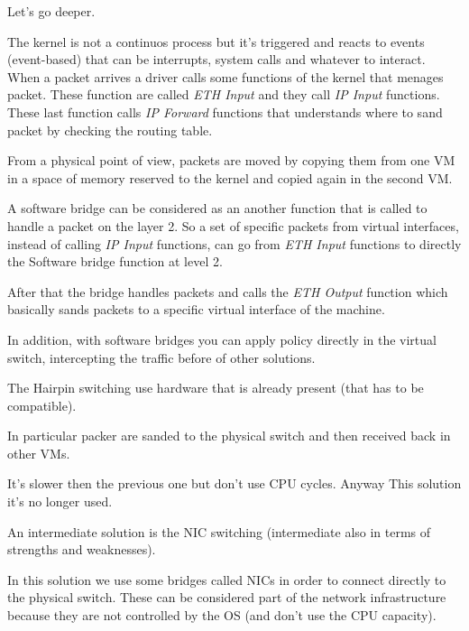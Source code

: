             Let's go deeper.
            
            The kernel is not a continuos process but it's triggered and reacts to events (event-based) that can be interrupts, system calls and whatever to interact.
            When a packet arrives a driver calls some functions of the kernel that menages packet. These function are called \textit{ETH Input} and they call \textit{IP Input} functions. These last function calls \textit{IP Forward} functions that understands where to sand packet by checking the routing table. 
            
            From a physical point of view, packets are moved by copying them from one VM in a space of memory reserved to the kernel and copied again in the second VM.
            
            A software bridge can be considered as an another function that is called to handle a packet on the layer 2. So a set of specific packets from virtual interfaces, instead of calling \textit{IP Input} functions, can go from \textit{ETH Input} functions to directly the Software bridge function at level 2.
            
            After that the bridge handles packets and calls the \textit{ETH Output} function which basically sands packets to a specific virtual interface of the machine.
            
            In addition, with software bridges you can apply policy directly in the virtual switch, intercepting the traffic before of other solutions.
            
            
            The Hairpin switching use hardware that is already present (that has to be compatible).
    
            In particular packer are sanded to the physical switch and then received back in other VMs.
            
            It's slower then the previous one but don't use CPU cycles. Anyway This solution it's no longer used.
            

            An intermediate solution is the NIC switching (intermediate also in terms of strengths and weaknesses). 
            
            In this solution we use some bridges called NICs in order to connect directly to the physical switch. These can be considered part of the network infrastructure because they are not controlled by the OS (and don't use the CPU capacity).
            

